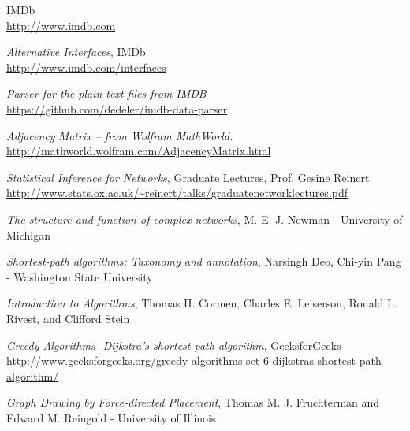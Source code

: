 \documentclass[12pt]{ieeeconf}      %
\begin{document}
\begin{thebibliography}{99}
\raggedright

IMDb\\
\url{http://www.imdb.com}
\newline
[Accessed 21/02/2017]

\emph{Alternative Interfaces}, IMDb\\
\url{http://www.imdb.com/interfaces}
\newline
[Accessed 21/02/2017]

\emph{Parser for the plain text files from IMDB}\\
\url{https://github.com/dedeler/imdb-data-parser}
\newline
[Accessed 08/03/2017]

\emph{Adjacency Matrix -- from Wolfram MathWorld.}\\
\url{http://mathworld.wolfram.com/AdjacencyMatrix.html}
\newline
[Accessed 7/03/2017]


\emph{Statistical Inference for Networks}, Graduate Lectures, Prof. Gesine Reinert\\
\url{http://www.stats.ox.ac.uk/~reinert/talks/graduatenetworklectures.pdf}
\newline
[Accessed 06/03/2017]

\textit{The structure and function of complex networks}, M. E. J. Newman - University of Michigan
\newline
[Published 04/08/2006]

\textit{Shortest-path algorithms: Taxonomy and annotation}, Narsingh Deo, Chi-yin Pang - Washington State University
\newline
[Published 01/01/1984]

\textit{Introduction to Algorithms}, Thomas H. Cormen, Charles E. Leiserson, Ronald L. Rivest, and Clifford Stein
\newline
[Published 1990]

\emph{Greedy Algorithms -Dijkstra’s shortest path algorithm}, GeeksforGeeks\\
\url{http://www.geeksforgeeks.org/greedy-algorithms-set-6-dijkstras-shortest-path-algorithm/}
\newline
[Accessed 06/03/2017]

\emph{Graph Drawing by Force-directed Placement}, Thomas M. J. Fruchterman and Edward M. Reingold - University of Illinois
\newline
[Published 1991]


\end{thebibliography}
\end{document}
